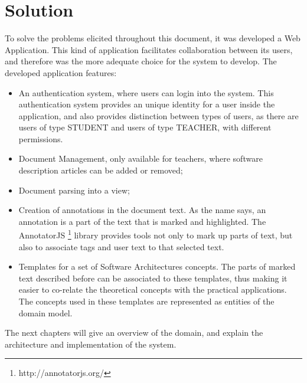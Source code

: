 
\chapter{Solution}
\label{chapter:solution}
To solve the problems elicited throughout this document, it was developed a Web Application. This kind of application facilitates collaboration between its users, and therefore was the more adequate choice for the system to develop. The developed application features:
\begin{itemize}
\item An authentication system, where users can login into the system. This authentication system provides an unique identity for a user inside the application, and also provides distinction between types of users, as there are users of type STUDENT and users of type TEACHER, with different permissions.
\item Document Management, only available for teachers, where software description articles can be added or removed;
\item Document parsing into a view;
\item Creation of annotations in the document text. As the name says, an annotation is a part of the text that is marked and highlighted. The AnnotatorJS \footnote{http://annotatorjs.org/} library provides tools not only to mark up parts of text, but also to associate tags and user text to that selected text. 
\item Templates for a set of Software Architectures concepts. The parts of marked text described before can be associated to these templates, thus making it easier to co-relate the theoretical concepts with the practical applications. The concepts used in these templates are represented as entities of the domain model.

\end{itemize}

The next chapters will give an overview of the domain, and explain the architecture and implementation of the system.